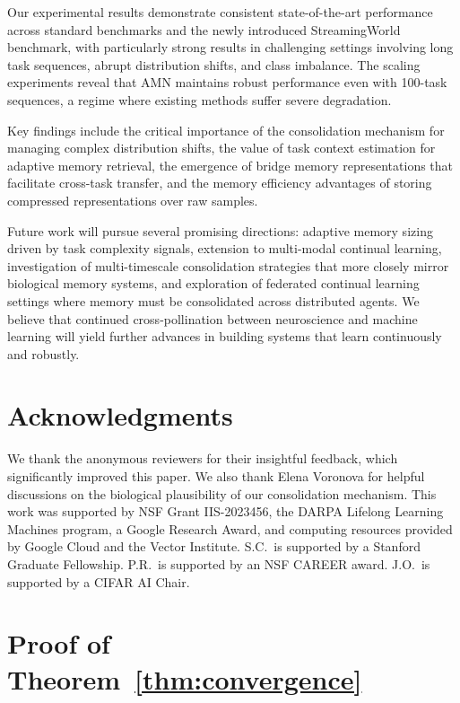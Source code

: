 \documentclass[11pt]{article}
\begin{document}
Our experimental results demonstrate consistent state-of-the-art performance across standard benchmarks and the newly introduced StreamingWorld benchmark, with particularly strong results in challenging settings involving long task sequences, abrupt distribution shifts, and class imbalance. The scaling experiments reveal that AMN maintains robust performance even with 100-task sequences, a regime where existing methods suffer severe degradation.

Key findings include the critical importance of the consolidation mechanism for managing complex distribution shifts, the value of task context estimation for adaptive memory retrieval, the emergence of bridge memory representations that facilitate cross-task transfer, and the memory efficiency advantages of storing compressed representations over raw samples.

Future work will pursue several promising directions: adaptive memory sizing driven by task complexity signals, extension to multi-modal continual learning, investigation of multi-timescale consolidation strategies that more closely mirror biological memory systems, and exploration of federated continual learning settings where memory must be consolidated across distributed agents. We believe that continued cross-pollination between neuroscience and machine learning will yield further advances in building systems that learn continuously and robustly.

\section*{Acknowledgments}

We thank the anonymous reviewers for their insightful feedback, which significantly improved this paper. We also thank Elena Voronova for helpful discussions on the biological plausibility of our consolidation mechanism. This work was supported by NSF Grant IIS-2023456, the DARPA Lifelong Learning Machines program, a Google Research Award, and computing resources provided by Google Cloud and the Vector Institute. S.C.\ is supported by a Stanford Graduate Fellowship. P.R.\ is supported by an NSF CAREER award. J.O.\ is supported by a CIFAR AI Chair.




\appendix

\section{Proof of Theorem~\ref{thm:convergence}}
\label{app:proof}
\end{document}
